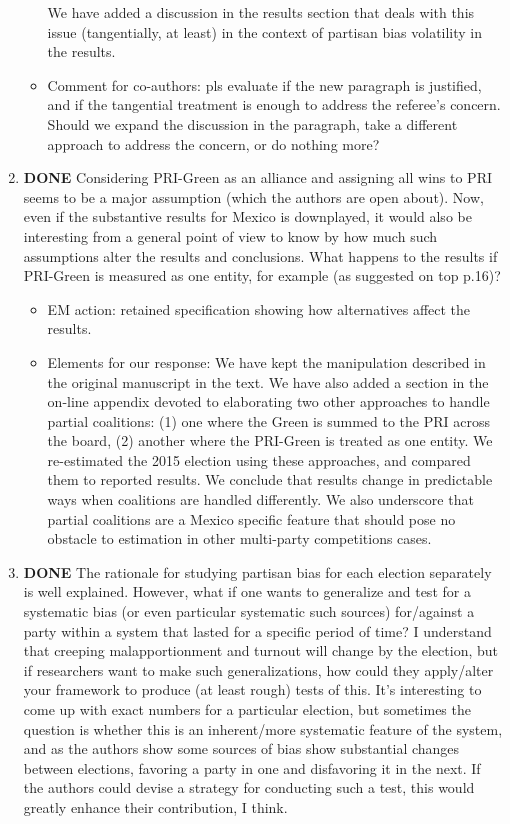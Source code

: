 \documentclass{article}
\begin{document}
\begin{enumerate}
\begin{itemize}
We have added a discussion in the results section that deals with this issue (tangentially, at least) in the context of partisan bias volatility in the results.
\item Comment for co-authors: pls evaluate if the new paragraph is justified, and if the tangential treatment is enough to address the referee's concern. Should we expand the discussion in the paragraph, take a different approach to address the concern, or do nothing more?
\end{itemize}
\item {\bfseries\sffamily DONE} Considering PRI-Green as an alliance and assigning all wins to PRI seems to be a major assumption (which the authors are open about). Now, even if the substantive results for Mexico is downplayed, it would also be interesting from a general point of view to know by how much such assumptions alter the results and conclusions. What happens to the results if PRI-Green is measured as one entity, for example (as suggested on top p.16)?
\label{sec:orgheadline11}
\begin{itemize}
\item EM action: retained specification showing how alternatives affect the results.
\item Elements for our response: We have kept the manipulation described in the original manuscript in the text. We have also added a section in the on-line appendix devoted to elaborating two other approaches to handle partial coalitions: (1) one where the Green is summed to the PRI across the board, (2) another where the PRI-Green is treated as one entity. We re-estimated the 2015 election using these approaches, and compared them to reported results. We conclude that results change in predictable ways when coalitions are handled differently. We also underscore that partial coalitions are a Mexico specific feature that should pose no obstacle to estimation in other multi-party competitions cases.
\end{itemize}
\item {\bfseries\sffamily DONE} The rationale for studying partisan bias for each election separately is well explained. However, what if one wants to generalize and test for a systematic bias (or even particular systematic such sources) for/against a party within a system that lasted for a specific period of time? I understand that creeping malapportionment and turnout will change by the election, but if researchers want to make such generalizations, how could they apply/alter your framework to produce (at least rough) tests of this. It's interesting to come up with exact numbers for a particular election, but sometimes the question is whether this is an inherent/more systematic feature of the system, and as the authors show some sources of bias show substantial changes between elections, favoring a party in one and disfavoring it in the next. If the authors could devise a strategy for conducting such a test, this would greatly enhance their contribution, I think.

\end{enumerate}
\end{document}
